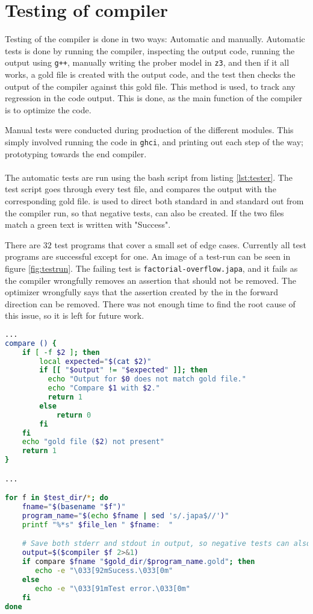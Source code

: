 \section{Testing of compiler } \label{sec:tests}
Testing of the compiler is done in two ways: Automatic and manually. Automatic tests is
done by running the compiler, inspecting the output code, running the output using \texttt{g++},
manually writing the prober model in \texttt{z3}, and then if it all works, a gold file is
created with the output code, and the test then checks the output of the compiler against this
gold file. This method is used, to track any regression in the code output. This is done, as
the main function of the compiler is to optimize the code.

Manual tests were conducted during production of the different modules. This simply involved
running the code in \texttt{ghci}, and printing out each step of the way; prototyping towards
the end compiler.
\\
\\
The automatic tests are run using the bash script from listing \ref{lst:tester}. The test
script goes through every test \lan file, and compares the output with the corresponding
gold file.  is used to direct both standard in and standard out from the compiler
run, so that negative tests, can also be created. If the two files match a green text
is written with "Success".

There are $32$ test programs that cover a small set of edge cases. Currently all test programs
are successful except for one. An image of a test-run can be seen in figure \ref{fig:testrun}.
The failing test is \texttt{factorial-overflow.japa}, and it fails as the compiler wrongfully
removes an assertion that should not be removed. The optimizer wrongfully says that the assertion
created by the  in the forward direction can be removed. There was not enough time
to find the root cause of this issue, so it is left for future work.


\begin{lstlisting}[language=Bash, label={lst:tester}]
...
compare () {
    if [ -f $2 ]; then
        local expected="$(cat $2)"
        if [[ "$output" != "$expected" ]]; then
          echo "Output for $0 does not match gold file."
          echo "Compare $1 with $2."
          return 1
        else
            return 0
        fi
    fi
    echo "gold file ($2) not present"
    return 1
}

...

for f in $test_dir/*; do
    fname="$(basename "$f")"
    program_name="$(echo $fname | sed 's/.japa$//')"
    printf "%*s" $file_len " $fname:  "

    # Save both stderr and stdout in output, so negative tests can also be tested
    output=$($compiler $f 2>&1)
    if compare $fname "$gold_dir/$program_name.gold"; then
       echo -e "\033[92mSucess.\033[0m"
    else
       echo -e "\033[91mTest error.\033[0m"
    fi
done
\end{lstlisting}